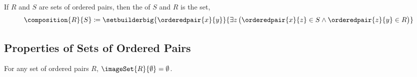 \begin{dfn}[Composition]
    \label{dfn:composition-of-two-sets-of-ordered-pairs}
    If \( R \) and \( S \) are sets of ordered pairs, then the  of \( S \) and \( R \) is the set,
    \begin{equation*}
        \composition{R}{S} \coloneq \setbuilderbig{\orderedpair{x}{y}}{\exists z \, \big( \orderedpair{x}{z} \in S \land \orderedpair{z}{y} \in R \big)}
    \end{equation*}
\end{dfn}

\subsection{Properties of Sets of Ordered Pairs} \label{ssec:properties-of-sets-of-ordered-pairs}
\begin{thm}
    \label{thm:empty-image-of-a-set-of-ordered-pairs}
    For any set of ordered pairs \( R \), \( \imageSet{R}{\emptyset} = \emptyset\).
\end{thm}

